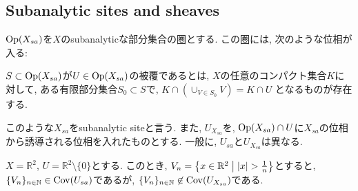 \documentclass[../main]{subfiles}
\begin{document}
\setcounter{section}{2}
\setcounter{subsection}{2} \addtocounter{subsection}{-1}
\subsection{Subanalytic sites and sheaves}
\begin{dfn}
  $\mathrm{Op}(X_{sa})$を$X$のsubanalyticな部分集合の圏とする.
  この圏には, 次のような位相が入る:

  $S\subset\mathrm{Op}(X_{sa})$が$U\in\mathrm{Op}(X_{sa})$の被覆であるとは,
  $X$の任意のコンパクト集合$K$に対して,
  ある有限部分集合$S_0\subset S$で,
  $K\cap (\cup_{V\in S_0} V) = K\cap U$
  となるものが存在する.

  このような$X_{sa}$をsubanalytic siteと言う.
  また, $U_{X_{sa}}$を,
  $\mathrm{Op}(X_{sa})\cap U$に$X_{sa}$の位相から誘導される位相を入れたものとする.
  一般に, $U_{sa}$と$U_{X_{sa}}$は異なる.
\end{dfn}

\begin{eg}
  $X = \mathbb{R}^2$, $U = \mathbb{R}^2\setminus\{0\}$とする.
  このとき, $V_n = \left\{ x\in\mathbb{R}^2 \relmiddle{|} |x|>\frac{1}{n} \right\}$とすると,
  $\{V_n\}_{n\in\mathbb{N}}\in\mathrm{Cov}(U_{sa})$であるが,
  $\{V_n\}_{n\in\mathbb{N}}\not\in\mathrm{Cov}(U_{X_{sa}})$である.
\end{eg}
\end{document}
